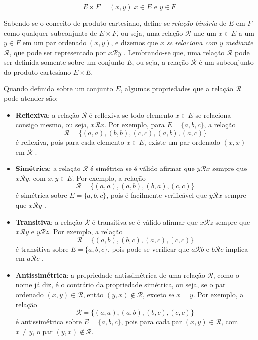 \begin{equation}
  E \times F = {(x, y) | x \in E \mbox{ e } y \in F}
\end{equation}

Sabendo-se o conceito de produto cartesiano, define-se \textit{relação binária} de \(E\) em \(F\) como qualquer subconjunto de \(E \times F\), ou seja, uma relação \(\mathcal{R}\) une um \(x \in E\) a um \(y \in F\) em um par ordenado \((x, y)\), e dizemos que \textit{\(x\) se relaciona com \(y\) mediante \(\mathcal{R}\)}, que pode ser representado por \(x\mathcal{R}y\) \cite{Domingues:2003}. Lembrando-se que, uma relação \(\mathcal{R}\) pode ser definida somente sobre um conjunto \(E\), ou seja, a relação \(\mathcal{R}\) é um subconjunto do produto cartesiano \(E \times E\).

Quando definida sobre um conjunto \(E\), algumas propriedades que a relação \(\mathcal{R}\) pode atender são:

\begin{itemize}
  \item \textbf{Reflexiva}: a relação \(\mathcal{R}\) é reflexiva se todo elemento \(x \in E\) se relaciona consigo mesmo, ou seja, \(x\mathcal{R}x\). Por exemplo, para \(E = \{a, b, c\}\), a relação 
  $$\mathcal{R} = \{(a, a), (b, b), (c, c), (a, b), (a, c)\}$$
  é reflexiva, pois para cada elemento \(x \in E\), existe um par ordenado \((x, x)\) em \(\mathcal{R}\) \cite{Domingues:2003}. 

  \item \textbf{Simétrica}: a relação \(\mathcal{R}\) é simétrica se é válido afirmar que \(y\mathcal{R}x\) sempre que \(x\mathcal{R}y\), com \(x, y \in E\). Por exemplo, a relação 
  $$\mathcal{R} = \{(a, a), (a, b), (b, a), (c, c)\}$$
  é simétrica sobre \(E = \{a, b, c\}\), pois é facilmente verificável que \(y\mathcal{R}x\) sempre que \(x\mathcal{R}y\) \cite{Domingues:2003}.

  \item \textbf{Transitiva}: a relação \(\mathcal{R}\) é transitiva se é válido afirmar que \(x\mathcal{R}z\) sempre que \(x\mathcal{R}y\) e \(y\mathcal{R}z\). Por exemplo, a relação 
  $$\mathcal{R} = \{(a, b), (b, c), (a, c), (c, c)\}$$
  é transitiva sobre \(E = \{a, b, c\}\), pois pode-se verificar que \(a\mathcal{R}b\) e \(b\mathcal{R}c\) implica em \(a\mathcal{R}c\) \cite{Domingues:2003}.

  \item \textbf{Antissimétrica}: a propriedade antissimétrica de uma relação \(\mathcal{R}\), como o nome já diz, é o contrário da propriedade simétrica, ou seja, se o par ordenado \((x, y) \in \mathcal{R}\), então \((y, x) \notin \mathcal{R}\), exceto se \(x = y\). Por exemplo, a relação 
  $$\mathcal{R} = \{(a, a), (a, b), (b, c), (c, c)\}$$
  é antissimétrica sobre \(E = \{a, b, c\}\), pois para cada par \((x, y) \in \mathcal{R}\), com \(x \neq y\), o par \((y, x) \notin \mathcal{R}\).
\end{itemize}

